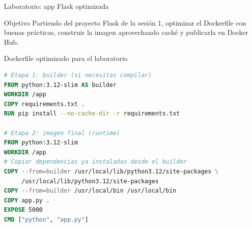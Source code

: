 \documentclass[aspectratio=169]{beamer}
\begin{document}
\begin{frame}{Laboratorio: app Flask optimizada}
  \begin{center}
  \end{center}
  \vspace{0.2cm}
  \begin{block}{Objetivo}
    Partiendo del proyecto Flask de la sesión 1, optimizar el Dockerfile con buenas prácticas, construir la imagen aprovechando caché y publicarla en Docker Hub.
  \end{block}
\end{frame}

\begin{frame}[fragile]{Dockerfile optimizado para el laboratorio}
\begin{lstlisting}[language=Dockerfile, basicstyle=\ttfamily\scriptsize]
# Etapa 1: builder (si necesitas compilar)
FROM python:3.12-slim AS builder
WORKDIR /app
COPY requirements.txt .
RUN pip install --no-cache-dir -r requirements.txt

# Etapa 2: imagen final (runtime)
FROM python:3.12-slim
WORKDIR /app
# Copiar dependencias ya instaladas desde el builder
COPY --from=builder /usr/local/lib/python3.12/site-packages \
     /usr/local/lib/python3.12/site-packages
COPY --from=builder /usr/local/bin /usr/local/bin
COPY app.py .
EXPOSE 5000
CMD ["python", "app.py"]
\end{lstlisting}
\end{frame}
\end{document}
